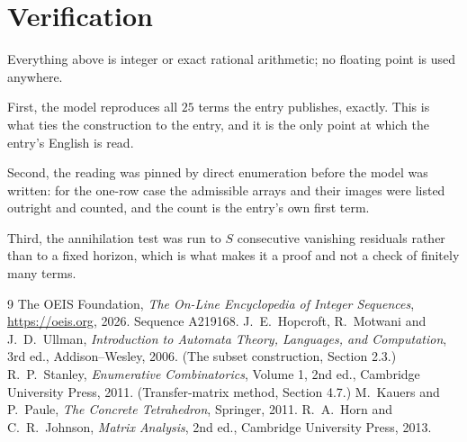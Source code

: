 \documentclass[11pt,a4paper]{article}
\theoremstyle{plain}
\theoremstyle{definition}
\begin{document}
\section{Verification}

Everything above is integer or exact rational arithmetic; no floating point is used anywhere.

First, the model reproduces all $25$ terms the entry publishes, exactly. This is what
ties the construction to the entry, and it is the only point at which the entry's English is
read.

Second, the reading was pinned by direct enumeration before the model was written: for the
one-row case the admissible arrays and their images were listed outright and counted, and the
count is the entry's own first term.

Third, the annihilation test was run to $S$ consecutive vanishing residuals rather than to a
fixed horizon, which is what makes it a proof and not a check of finitely many terms.

\begin{thebibliography}{9}
 The OEIS Foundation, \emph{The On-Line Encyclopedia of Integer
Sequences}, \url{https://oeis.org}, 2026. Sequence A219168.
 J.~E.~Hopcroft, R.~Motwani and J.~D.~Ullman, \emph{Introduction to Automata
Theory, Languages, and Computation}, 3rd ed., Addison--Wesley, 2006. (The subset
construction, Section 2.3.)
 R.~P.~Stanley, \emph{Enumerative Combinatorics}, Volume 1, 2nd ed.,
Cambridge University Press, 2011. (Transfer-matrix method, Section 4.7.)
 M.~Kauers and P.~Paule, \emph{The Concrete Tetrahedron}, Springer, 2011.
 R.~A.~Horn and C.~R.~Johnson, \emph{Matrix Analysis}, 2nd ed., Cambridge
University Press, 2013.
\end{thebibliography}
\end{document}
